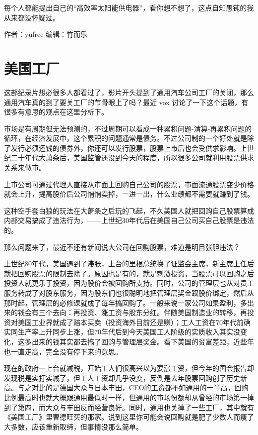 \documentclass[
]{book}
\begin{document}
每个人都能提出自己的``高效率太阳能供电器''，看你想不想了，这点自知愚钝的我从来都没怀疑过。

作者：yufree
编辑：竹而乐

\hypertarget{ux7f8eux56fdux5de5ux5382}{%
\section{美国工厂}\label{ux7f8eux56fdux5de5ux5382}}

这部纪录片想必很多人都看过了，影片开头提到了通用汽车公司工厂的关闭，那么通用汽车真的到了要关工厂的节⻣眼上了吗？最近 vox 讨论了一下这个话题，有很多有意思的观点在这里分析下。

市场是有周期但无法预测的，不过周期可以看成一种累积问题-清算-再累积问题的循环，在经济发展中，这个累积的问题通常是债务。不过公司制的一个好处就是除了发行必须还钱的债券外，你还可以发行股票，股票上市后也会受供求影响。上世纪二十年代大萧条后，美国监管还没到今天的程度，所以很多公司就利用股票供求关系来做市。

上市公司可通过代理人直接从市面上回购自己公司的股票，市面流通股票变少价格就会上升，提高股价后公司悄悄卖掉，一进一出，什么业绩都不需要就赚到了钱。

这种空手套白狼的玩法在大萧条之后玩的飞起，不久美国人就把回购自己股票算成内部交易搞成了违法行为，------上世纪30年代后在美国自己公司买自己股票是违法的。

那么问题来了，最近不还有新闻说大公司在回购股票，难道是明目张胆违法？

上世纪80年代，美国遇到了滞胀，上台的里根总统换了证监会主席，新主席上任后就把回购股票的限制去除了。原因也是有的，就是刺激投资，当股票可以回购之后投资人就更乐于投资，因为股价会被回购所支持。同时，公司的管理层也从对员工服务转成了对股东服务，因为股东们也很聪明地把管理层奖金跟股价绑定，然后从那时起，管理层的必修课就成了每年搞回购了。一般来说一家公司如果盈利，多出来的钱会有三个去向：再投资、涨工资与股东分红。伴随美国制造业的转移，再投资对美国工业界就成了赔本买卖（投资海外目前还是赚）；工人工资在70年代前确实同生产率上升同步上涨，但70年代后到今天美国工人阶级的实质收入其实没变化，这多出来的钱其实都去搞了回购与管理层奖金。看下美国的贫富差距，近些年也一直走高，完全没有停下来的意思。

现在的政府一上台就减税，开始工人们很高兴以为要涨工资，但今年的国会报告却发现税是实打实减了，但工人工资却几乎没变，反倒是去年股票回购创了历史新高。与之对比的是德国大众与日本丰田，CEO的工资都不如通用的一半高，回购比例最高时也就大概跟通用最低时一样，但通用的市场份额却从曾经的市场第一掉到了第四，而大众与丰田反而经营良好。同时，通用也关掉了一些工厂，其中就有《美国工厂》里曹德旺买的那家。说到这里你可能会说回购就是肥了少数人而瘦了大多数，应该重新取缔，但事情没那么简单。
\end{document}
